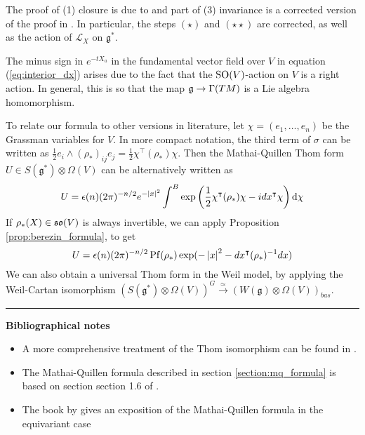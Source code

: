 The proof of (1) closure is due to \citet{guillemin} and part of (3) invariance
is a corrected version of the proof in \citet[p.27]{constantinescu}. In
particular, the steps $(\star)$ and  $(\star\star)$ are corrected, as well as
the action of $\mathcal{L}_X$ on $\mathfrak{g}^*$. 

\begin{remark}
	The minus sign in $e^{-tX_a}$ in the fundamental vector field over $V$ in
	equation (\ref{eq:interior_dx}) arises due to the fact that the
	$\operatorname{SO}(V)$-action on $V$ is a right action. In general, this is so that the
	map $\operatorname{\mathfrak{g}} \to \Gamma(TM)$ is a Lie algebra homomorphism. 
\end{remark}	
 
To relate our formula to other versions in literature, let $\chi =
(e_1,\ldots,e_n)$ be the Grassman variables for $V$. 
In more compact notation, the third term of $\sigma$ can be written  
as $\frac{1}{2} e_i \wedge (\rho_*)_{ij} e_j = \frac{1}{2} \chi^\intercal
(\rho_*) \chi$. Then the Mathai-Quillen Thom form 
$U\in S(\mathfrak{g}^*)\otimes \Omega(V)$ can be alternatively written as 
\begin{equation} \label{eq:universal_thom_form} %
	U = \epsilon(n)(2\pi)^{-n /2}e^{-\abs{x}^2} 
	\int^B \exp \paren{\frac{1}{2}\chi^{\intercal}(\rho_*)\chi -
idx^{\intercal}\chi} \odif{\chi} 
\end{equation}
If $\rho_*(X)\in\operatorname{\mathfrak{so}}(V)$ is always invertible, we can apply
Proposition \ref{prop:berezin_formula}, to get
\[
	U = \epsilon(n)(2\pi)^{-n/2} \Pf(\rho_*) \exp(-\abs{x}^2-dx^{\intercal} (\rho_*)^{-1}dx)
\] 
We can also obtain a universal Thom form in the Weil model, by 
applying the Weil-Cartan isomorphism $(S(\mathfrak{g}^*)\otimes \Omega(V))^G
\xrightarrow{\simeq}(W(\mathfrak{g})\otimes \Omega(V))_{bas}$. 

\begin{comment} %
\[%
		U = (2\pi)^{-m} \Pf(\phi) \exp(-\abs{x}^2-\gen{\nabla x,\phi^{-1}\nabla x})
\] 
\[%
	U = (2\pi)^{-m}\Pf(\Omega) \exp(-x^2-(dx+\theta x)^\intercal \Omega^{-1}
	(dx+\theta x))
\]
\end{comment}


\vspace{5mm}
\hrule 
\vspace{5mm}

\textbf{Bibliographical notes}
{\small
\begin{itemize}
	\item A more comprehensive treatment of the Thom isomorphism can be found in
		\citet{bott_tu}.  
	\item The Mathai-Quillen formula described in section
		\ref{section:mq_formula} is based on section 
		section 1.6 of \cite{bgv}.
	\item The book by \citet{guillemin} gives an exposition of the
	Mathai-Quillen formula in the equivariant case 
\end{itemize}
}
